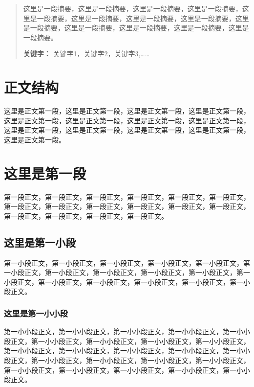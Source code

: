 
\begin{abstract}
	
	这里是一段摘要，这里是一段摘要，这里是一段摘要，这里是一段摘要，这里是一段摘要，这里是一段摘要，这里是一段摘要，这里是一段摘要，这里是一段摘要，这里是一段摘要，这里是一段摘要，这里是一段摘要，这里是一段摘要。
	
	\noindent \textbf{关键字：} 关键字1，关键字2，关键字3,……
\end{abstract}

\section*{正文结构}

这里是正文第一段，这里是正文第一段，这里是正文第一段，这里是正文第一段，这里是正文第一段，这里是正文第一段，这里是正文第一段，这里是正文第一段，这里是正文第一段，这里是正文第一段，这里是正文第一段，这里是正文第一段，这里是正文第一段。

\section{这里是第一段}

第一段正文，第一段正文，第一段正文，第一段正文，第一段正文，第一段正文，第一段正文，第一段正文，第一段正文，第一段正文，第一段正文，第一段正文，第一段正文，第一段正文，第一段正文，第一段正文。

\subsection{这里是第一小段}

第一小段正文，第一小段正文，第一小段正文，第一小段正文，第一小段正文，第一小段正文，第一小段正文，第一小段正文，第一小段正文，第一小段正文，第一小段正文，第一小段正文，第一小段正文，第一小段正文，第一小段正文，第一小段正文。

\subsubsection{这里是第一小小段}

第一小小段正文，第一小小段正文，第一小小段正文，第一小小段正文，第一小小段正文，第一小小段正文，第一小小段正文，第一小小段正文，第一小小段正文，第一小小段正文，第一小小段正文，第一小小段正文，第一小小段正文，第一小小段正文，第一小小段正文，第一小小段正文，第一小小段正文，第一小小段正文，第一小小段正文，第一小小段正文，第一小小段正文，第一小小段正文，第一小小段正文。

